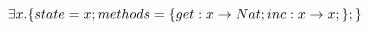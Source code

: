 \documentclass{article}
\begin{document}
$ \exists x . \{
\newline
state=x ;
\newline
methods=\{
\newline
get : x \rightarrow Nat;
\newline
inc : x \rightarrow x;
\newline
\};
\newline
\}
$
\end{document}

